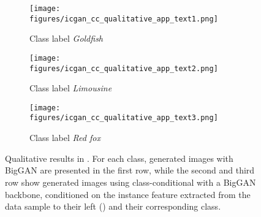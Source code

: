 \begin{figure}
\centering
\begin{subfigure}{1\textwidth}
 \centering
\texttt{[image: figures/icgan\_cc\_qualitative\_app\_text1.png]}
\caption{Class label \textit{Goldfish}}
\label{app:goldfish}
\end{subfigure}
\begin{subfigure}{1\textwidth}
 \centering
\texttt{[image: figures/icgan\_cc\_qualitative\_app\_text2.png]}
\caption{Class label \textit{Limousine}}
\label{app:limousine}
\end{subfigure}
\begin{subfigure}{1\textwidth}
 \centering
\texttt{[image: figures/icgan\_cc\_qualitative\_app\_text3.png]}
\caption{Class label \textit{Red fox}}
\label{app:red_fox}
\end{subfigure}
\caption{Qualitative results in  \ImNet. For each class, generated images with BigGAN are presented in the first row, while the second and third row show generated images using class-conditional \ours with a BigGAN backbone, conditioned on the instance feature extracted from the data sample to their left () and their corresponding class.}
\label{fig:icgan_cc_qualitative_app}
\end{figure}



